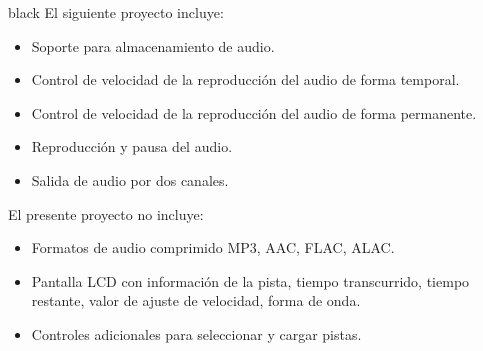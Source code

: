 \documentclass[11pt]{charter}
\begin{document}
\begin{consigna}{black}
El siguiente proyecto incluye:
\begin{itemize}
\item Soporte para almacenamiento de audio.
\item Control de velocidad de la reproducción del audio de forma temporal.
\item Control de velocidad de la reproducción del audio de forma permanente.
\item Reproducción y pausa del audio.
\item Salida de audio por dos canales.
\end{itemize}

El presente proyecto no incluye:
\begin{itemize}
\item Formatos de audio comprimido MP3, AAC, FLAC, ALAC.
\item Pantalla LCD con información de la pista, tiempo transcurrido, tiempo restante, valor de ajuste de velocidad, forma de onda.
\item Controles adicionales para seleccionar y cargar pistas.
\end{itemize}
\end{consigna}
\end{document}
